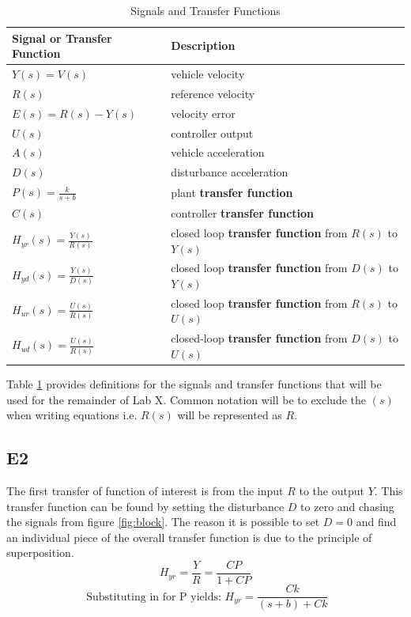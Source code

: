 \documentclass[10pt,titlepage]{article}
\begin{document}
	\begin{table}[H]
		\centering
		\begin{tabular}{|m{5cm}|m{9cm}|} 
		\hline
		Signal or Transfer Function & Description \\ 
		\hline
		$Y(s)=V(s)$ & vehicle velocity \\
		\hline
		$R(s)$ & reference velocity \\
		\hline
		$E(s)=R(s)-Y(s)$ & velocity error \\
		\hline
		$U(s)$ & controller output \\
		\hline
		$A(s)$ & vehicle acceleration \\
		\hline
		$D(s)$ & disturbance acceleration \\
		\hline 
		$P(s)=\frac{k}{s+b}$ & plant \textbf{transfer function} \\
		\hline 
		$C(s)$ & controller \textbf{transfer function} \\
		\hline 
		$H_{yr}(s)=\frac{Y(s)}{R(s)}$ & closed loop \textbf{transfer function} from $R(s)$ to $Y(s)$ \\
		\hline 
		$H_{yd}(s)=\frac{Y(s)}{D(s)}$ & closed loop \textbf{transfer function} from $D(s)$ to $Y(s)$ \\
		\hline 
		$H_{ur}(s)=\frac{U(s)}{R(s)}$ & closed loop \textbf{transfer function} from $R(s)$ to $U(s)$ \\
		\hline
		$H_{ud}(s)=\frac{U(s)}{R(s)}$ & closed-loop \textbf{transfer function} from $D(s)$ to $U(s)$ \\
		\hline
		\end{tabular}
		\caption{Signals and Transfer Functions} \label{table:SaTF}
		\end{table}

		\noindent Table \ref{table:SaTF} provides definitions for the signals and transfer functions that will be used for the remainder of Lab X. Common notation will be to exclude the $(s)$ when writing equations i.e. $R(s)$ will be represented as $R$.

	\subsection*{E2}
		The first transfer of function of interest is from the input $R$ to the output $Y$. This transfer function can be found by setting the disturbance $D$ to zero and chasing the signals from figure \ref{fig:block}. The reason it is possible to set $D=0$ and find an individual piece of the overall transfer function is due to the principle of superposition.
		\begin{equation}
			H_{yr}=\frac{Y}{R}=\frac{CP}{1+CP}
		\end{equation}
		\begin{equation} \label{eq:Hyr}
			\mbox{ Substituting in for P yields: } H_{yr}=\frac{Ck}{(s+b)+Ck}
		\end{equation} 
	
\end{document}

